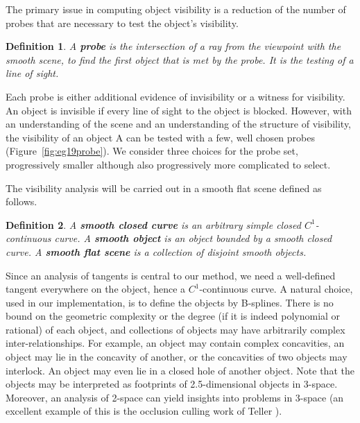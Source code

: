 \documentclass[10pt,twocolumn]{article}
\newtheorem{defn2}{Definition}
\begin{document}
The primary issue in computing object visibility
is a reduction of the number of probes 
that are necessary to test the object's visibility.
%
\begin{defn2}
A {\bf probe} is the intersection of a ray from the viewpoint with the smooth scene,
to find the first object that is met by the probe.
It is the testing of a line of sight.
\end{defn2}
\noindent 
Each probe is either additional evidence of invisibility or a witness for visibility.
An object is invisible if every line of sight to the object is blocked.
However, with an understanding of the scene and an understanding of the structure of
visibility,
the visibility of an object A can be tested with a few, well chosen probes
(Figure~\ref{fig:eg19probe}).
We consider three choices for the probe set,
progressively smaller although also progressively more complicated to select.

The visibility analysis will be carried out in a smooth flat scene defined as follows.

\begin{defn2}
A {\bf smooth closed curve} is an arbitrary simple
closed $C^1$-continuous curve.
A {\bf smooth object} is an object bounded by a smooth closed curve.
A {\bf smooth flat scene} is a collection of disjoint smooth objects.
\end{defn2}


Since an analysis of tangents is central to our method,
we need a well-defined tangent everywhere on the object,
hence a $C^1$-continuous curve.
A natural choice, used in our implementation, is to define the objects by B-splines.
There is no bound on the geometric complexity or the degree 
(if it is indeed polynomial or rational) of each object,
and collections of objects may have arbitrarily complex inter-relationships.
For example, an object may contain complex concavities,
an object may lie in the concavity of another, or the concavities of two objects
may interlock.
An object may even lie in a closed hole of another object.
Note that the objects may be interpreted as footprints of 2.5-dimensional
objects in 3-space. %
Moreover, an analysis of 2-space can yield insights into problems in 3-space
(an excellent example of this is the occlusion culling work of Teller \cite{teller91}).
\end{document}
